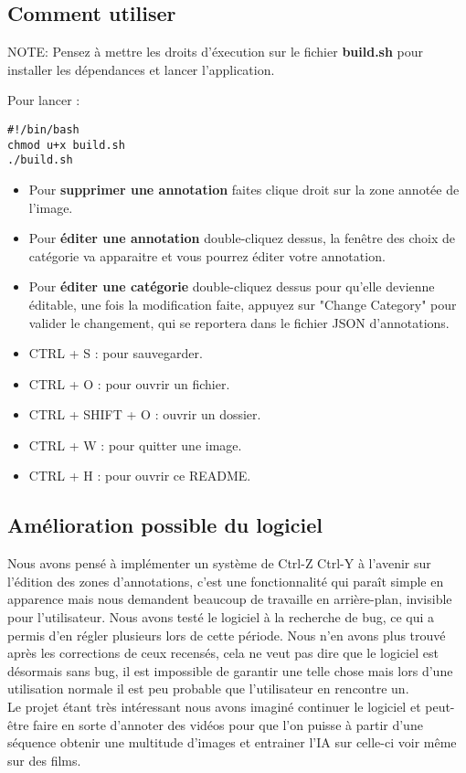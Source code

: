 \documentclass[a4paper,12pt]{article}
\begin{document}
\subsection{Comment utiliser}
NOTE: Pensez à mettre les droits d'éxecution sur le fichier \textbf{build.sh} pour installer les dépendances et lancer l'application.

Pour lancer :
\begin{verbatim}
#!/bin/bash
chmod u+x build.sh
./build.sh
\end{verbatim}


\begin{itemize}
  \item Pour \textbf{supprimer une annotation} faites clique droit sur la zone annotée de l'image.
  \item Pour \textbf{éditer une annotation} double-cliquez dessus, la fenêtre des choix de catégorie va apparaitre et vous pourrez éditer votre annotation.
  \item Pour \textbf{éditer une catégorie} double-cliquez dessus pour qu'elle devienne éditable, une fois la modification faite, appuyez sur "Change Category" pour valider le changement, qui se reportera dans le fichier JSON d'annotations.
  \item CTRL + S : pour sauvegarder.
  \item CTRL + O : pour ouvrir un fichier.
  \item CTRL + SHIFT + O : ouvrir un dossier.
  \item CTRL + W : pour quitter une image.
  \item CTRL + H : pour ouvrir ce README.

\end{itemize}




\subsection{Amélioration possible du logiciel}

Nous avons pensé à implémenter un système de Ctrl-Z Ctrl-Y à l'avenir sur l'édition des zones d'annotations, c'est une fonctionnalité qui paraît simple en apparence mais nous demandent beaucoup de travaille en arrière-plan, invisible pour l'utilisateur.
Nous avons testé le logiciel à la recherche de bug, ce qui a permis d'en régler plusieurs lors de cette période. Nous n'en avons plus trouvé après les corrections de ceux recensés, cela ne veut pas dire que le logiciel est désormais sans bug, il est impossible de garantir une telle chose mais lors d’une utilisation normale il est peu probable que l'utilisateur en rencontre un. \\
Le projet étant très intéressant nous avons imaginé continuer le logiciel et peut-être faire en sorte d'annoter des vidéos pour que l'on puisse à partir d'une séquence obtenir une multitude d'images et entrainer l'IA sur celle-ci voir même sur des films.
\end{document}
